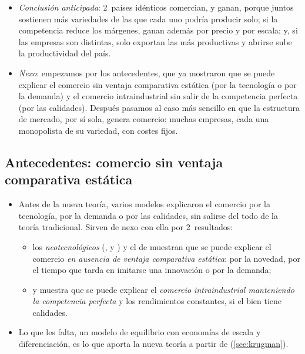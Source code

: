 \documentclass[11pt]{article}
\begin{document}
\begin{itemize}
\item \emph{Conclusión anticipada}: 2~países idénticos comercian, y ganan, porque juntos sostienen más variedades de las que cada uno podría producir solo; si la competencia reduce los márgenes, ganan además por precio y por escala; y, si las empresas son distintas, solo exportan las más productivas y abrirse sube la productividad del país.
\item \emph{Nexo}: empezamos por los antecedentes, que ya mostraron que se puede explicar el comercio sin ventaja comparativa estática (por la tecnología o por la demanda) y el comercio intraindustrial sin salir de la competencia perfecta (por las calidades). Después pasamos al caso más sencillo en que la estructura de mercado, por sí sola, genera comercio: muchas empresas, cada una monopolista de su variedad, con costes fijos.
\end{itemize}

\subsection{Antecedentes: comercio sin ventaja comparativa estática}\label{sec:antecedentes}

\begin{itemize}
\item Antes de la nueva teoría, varios modelos explicaron el comercio por la tecnología, por la demanda o por las calidades, sin salirse del todo de la teoría tradicional. Sirven de nexo con ella por 2~resultados:
  \begin{itemize}
  \item los \emph{neotecnológicos} (,  y ) y el de  muestran que se puede explicar el comercio \emph{en ausencia de ventaja comparativa estática}: por la novedad, por el tiempo que tarda en imitarse una innovación o por la demanda;
  \item y  muestra que se puede explicar el \emph{comercio intraindustrial manteniendo la competencia perfecta} y los rendimientos constantes, si el bien tiene calidades.
  \end{itemize}
\item Lo que les falta, un modelo de equilibrio con economías de escala y diferenciación, es lo que aporta la nueva teoría a partir de  (\ref{sec:krugman}).
\end{itemize}
\end{document}
